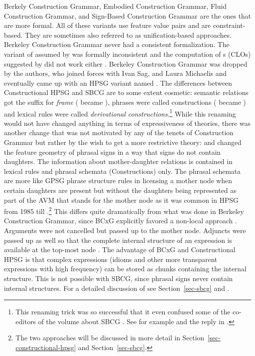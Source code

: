 \documentclass[output=paper]{langsci/langscibook}
\begin{document}
Berkely Construction Grammar, Embodied Construction Grammar, Fluid Construction Grammar, and
Sign-Based Construction Grammar are the ones that are more formal. All of these variants use feature
value pairs and are constraint-based. They are sometimes also referred to as unification-based
approaches. Berkeley Construction Grammar never had a consistent formalization. The variant of
 assumed by \citet{KF99a} was formally inconsistent \citep[Section~2.4]{Mueller2006d} and the computation of s (CLOs) suggested  by \citet{Kay2002a} did not work either \citep[Section~3]{Mueller2006d}. Berkeley Construction
Grammar was dropped by the authors, who joined forces with Ivan Sag, and Laura Michaelis and eventually
came up with an HPSG variant named \sbcg{} \citep{Sag2012a}. The differences between
Constructional HPSG \citep{Sag97a} and SBCG are to some extent cosmetic: semantic relations got the
suffix  for \emph{frame} ( became ), phrases were called constructions ( became
) and lexical rules were called \emph{derivational constructions}.\footnote{
This renaming trick was so successful that it even confused some of the co-editors of the volume about
SBCG \citep{BS2012a-ed}. See for example  and the reply in .
}
While this renaming would not have changed anything in terms of expressiveness of theories, there
was another change that was not motivated by any of the tenets of Construction Grammar but rather by
the wish to get a more restrictive theory: \citet*{SWB2003a} and \citet{Sag2007a} changed the feature geometry of phrasal
signs in a way that signs do not contain daughters. The information about mother-daughter relations
is contained in lexical rules and phrasal schemata (Constructions) only. The phrasal schemata are
more like GPSG phrase structure rules in licensing a mother node when certain daughters are present
but without the daughters being represented as part of the AVM that stands for the mother node as it
was common in HPSG from 1985 till .\footnote{%
  The two approaches will be discussed in more detail in Section~\ref{sec-constructional-hpsg} and Section~\ref{sec-sbcg}.
}
This differs quite dramatically from what was done in Berkeley Construction
Grammar, since BCxG explicitly favored a non-local approach \parencites[]{Fillmore88a}[]{FKoC88a}. Arguments were not cancelled but
passed up to the mother node. Adjuncts were passed up as well so that the complete internal
structure of an expression is available at the top-most node \citep[]{KF99a}. The advantage of BCxG and
Constructional HPSG \citep{Sag97a} is that complex expressions (\eg idioms and other more transparent expressions
with high frequency) can be stored as chunks containing the internal structure. This is not possible
with SBCG, since phrasal signs never contain internal structures. For a detailed discussion of \sbcg
see Section~\ref{sec-sbcg} and .
\end{document}
